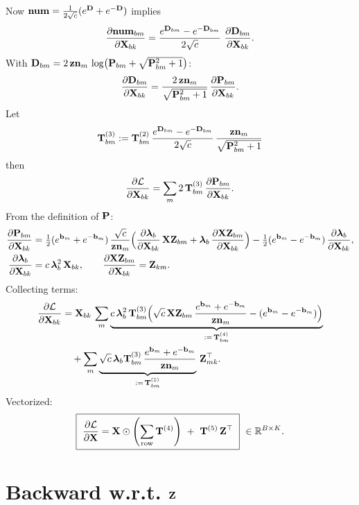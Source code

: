 \documentclass{article}
\begin{document}
Now $\v{num}=\tfrac{1}{2\sqrt{c}}(\ev{D}+\ev{-D})$ implies
\begin{align}
\ddfrac{\v{num}{bm}}{\v{X}{bk}}
= \frac{\ev{D}{bm}-\ev{-D}{bm}}{2\sqrt{c}}\ \ddfrac{\v{D}{bm}}{\v{X}{bk}}.
\end{align}
With $\v{D}{bm}=2\,\v{zn}{m}\,\log\!\big(\v{P}{bm}+\sqrt{\v{P}{bm}^2+1}\big)$:
\begin{align}
\ddfrac{\v{D}{bm}}{\v{X}{bk}}
= \frac{2\,\v{zn}{m}}{\sqrt{\v{P}{bm}^2+1}}\,\ddfrac{\v{P}{bm}}{\v{X}{bk}}.
\end{align}
Let
\[
\T{3}{bm}:= \T{2}{bm}\,\frac{\ev{D}{bm}-\ev{-D}{bm}}{2\sqrt{c}}\,\frac{\v{zn}{m}}{\sqrt{\v{P}{bm}^2+1}}
\]
then
\begin{align}
\ddfrac{\mathcal{L}}{\v{X}{bk}}
= \sum_m 2\,\T{3}{bm}\,\ddfrac{\v{P}{bm}}{\v{X}{bk}}.
\end{align}
From the definition of $\v{P}$:
\begin{align}
\ddfrac{\v{P}{bm}}{\v{X}{bk}}
&= \tfrac12(\ev{b}{m}+\ev{-b}{m})\,\frac{\sqrt{c}}{\v{zn}{m}}
\Big(\ddfrac{\lam_b}{\v{X}{bk}}\,\v{XZ}{bm} + \lam_b\,\ddfrac{\v{XZ}{bm}}{\v{X}{bk}}\Big)
- \tfrac12(\ev{b}{m}-\ev{-b}{m})\,\ddfrac{\lam_b}{\v{X}{bk}},
\\
\ddfrac{\lam_b}{\v{X}{bk}} &= c\,\lam_b^2\,\v{X}{bk},\qquad
\ddfrac{\v{XZ}{bm}}{\v{X}{bk}} = \v{Z}{km}.
\end{align}
Collecting terms:
\begin{align}
\ddfrac{\mathcal{L}}{\v{X}{bk}}
&= \v{X}{bk}\,\sum_m \underbrace{c\,\lam_b^2\,\T{3}{bm}\Big(\sqrt{c}\,\v{XZ}{bm}\,\frac{\ev{b}{m}+\ev{-b}{m}}{\v{zn}{m}} - (\ev{b}{m}-\ev{-b}{m})\Big)}_{:=\,\T{4}{bm}} \\
&\quad + \sum_m \underbrace{\sqrt{c}\,\lam_b \T{3}{bm}\,\frac{\ev{b}{m}+\ev{-b}{m}}{\v{zn}{m}}}_{:=\,\T{5}{bm}}\,\v{Z}{mk}^{\top}.
\end{align}
Vectorized:
\[
\boxed{\ \ddfrac{\mathcal{L}}{\v{X}} = \v{X} \odot \rownorm{\T{4}}\ +\ \T{5}\,\v{Z}^{\top}\ }\ \in\mathbb{R}^{B\times K}.
\]

\section{Backward w.r.t. $\v{Z}$}
\end{document}
